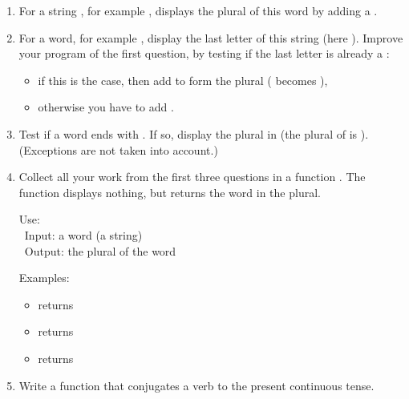 \documentclass[11pt,class=report,crop=false]{standalone}
\begin{document}
\begin{activite}


\begin{enumerate}
  \item For a string , for example , displays the plural of this word by adding a . 
  
  \item For a word, for example , display the last letter of this string (here ). Improve your program of the first question, by testing if the last letter is already a :
  \begin{itemize}
    \item if this is the case, then add  to form the plural ( becomes ),
    \item otherwise you have to add .
  \end{itemize} 

  \item Test if a word ends with . If so, display the plural in  (the plural of 
  is ). (Exceptions are not taken into account.)
  
  \item Collect all your work from the first three questions in a function . The function displays nothing, but returns the word in the plural.
  
  \medskip
  
  \begin{fonction}[\ci{plural()}]
  Use:  \\\
  Input: a word (a string) \\\
  Output: the plural of the word 
  
  \bigskip
  
  Examples: 
  \begin{itemize}
    \item {} returns 
    \item {} returns   
    \item \ci{plural("city")} returns          
  \end{itemize}     
  \end{fonction}

  \item Write a function  that conjugates a verb to the present continuous tense.
  

\end{enumerate}
\end{activite}
\end{document}
